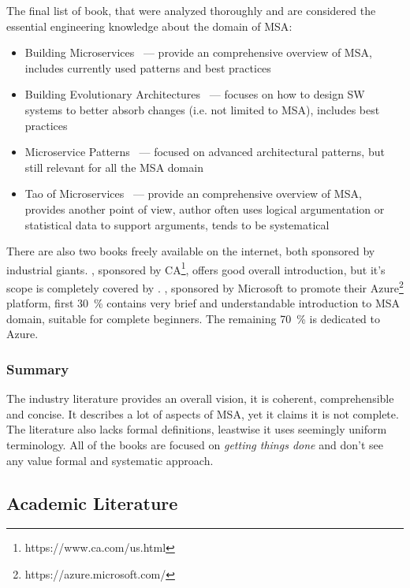 \documentclass[thesis=M,english,hidelinks]{FITthesis}[2012/10/20]
\begin{document}
The final list of book, that were analyzed thoroughly and are considered the essential engineering knowledge about the domain of \acrshort{MSA}:
\begin{itemize}
    \item Building Microservices~\cite{ms-building-ms} --- provide an comprehensive overview of \acrshort{MSA}, includes currently used patterns and best practices
    \item Building Evolutionary Architectures~\cite{ms-evolutionary-arch} --- focuses on how to design \acrshort{SW} systems to better absorb changes (i.e. not limited to \acrshort{MSA}), includes best practices
    \item Microservice Patterns~\cite{ms-patterns} --- focused on advanced architectural patterns, but still relevant for all the \acrshort{MSA} domain  
    \item Tao of Microservices~\cite{ms-tao} --- provide an comprehensive overview of \acrshort{MSA}, provides another point of view, author often uses logical argumentation or statistical data to support arguments, tends to be systematical
\end{itemize}

There are also two books freely available on the internet, both sponsored by industrial giants. \cite{ms-ca}, sponsored by CA\footnote{https://www.ca.com/us.html}, offers good overall introduction, but it's scope is completely covered by \cite{ms-building-ms}. \cite{ms-bk-familiar}, sponsored by Microsoft to promote their Azure\footnote{https://azure.microsoft.com/} platform, first 30~\% contains very brief and understandable introduction to \acrshort{MSA} domain, suitable for complete beginners. The remaining 70~\% is dedicated to Azure.

\subsubsection*{Summary}
The industry literature provides an overall vision, it is coherent, comprehensible and concise. It describes a lot of aspects of \acrshort{MSA}, yet it claims it is not complete. The literature also lacks formal definitions, leastwise it uses seemingly uniform terminology. All of the books are focused on \textit{getting things done} and don't see any value formal and systematic approach.

\subsection{Academic Literature}
\label{sec:acad_literature}
\end{document}
